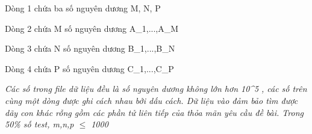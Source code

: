 Dòng 1 chứa ba số nguyên dương M, N, P

Dòng 2 chứa M số nguyên dương A\_1,...,A\_M

Dòng 3 chứa N số nguyên dương B\_1,...,B\_N

Dòng 4 chứa P số nguyên dương C\_1,...,C\_P

\emph{Các số trong file dữ liệu đều là số nguyên dương không lớn hơn 10^5 }\emph{ , các số trên cùng một dòng được ghi cách nhau bởi dấu cách. Dữ liệu vào đảm bảo tìm được dãy con khác rỗng gồm các phần tử liên tiếp của }\emph{ thỏa mãn yêu cầu đề bài. Trong 50\% số test, m,n,p  $\le$  1000 }

\